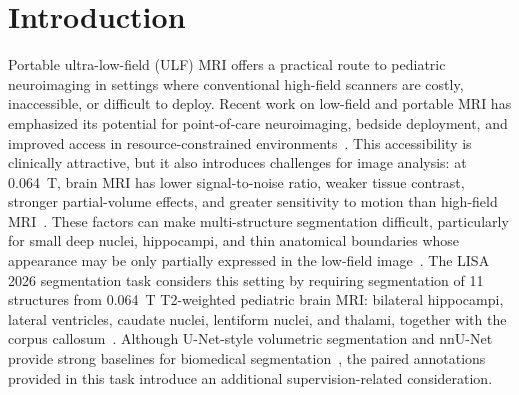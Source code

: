 \documentclass[runningheads]{llncs}
\begin{document}

\section{Introduction}

Portable ultra-low-field (ULF) MRI offers a practical route to pediatric neuroimaging in settings where conventional high-field scanners are costly, inaccessible, or difficult to deploy. Recent work on low-field and portable MRI has emphasized its potential for point-of-care neuroimaging, bedside deployment, and improved access in resource-constrained environments~\cite{arnold2023lowfield,kimberly2023brain,mazurek2021portable,sien2023feasibility}. This accessibility is clinically attractive, but it also introduces challenges for image analysis: at 0.064~T, brain MRI has lower signal-to-noise ratio, weaker tissue contrast, stronger partial-volume effects, and greater sensitivity to motion than high-field MRI~\cite{arnold2023lowfield,kimberly2023brain,billot2023synthseg}. These factors can make multi-structure segmentation difficult, particularly for small deep nuclei, hippocampi, and thin anatomical boundaries whose appearance may be only partially expressed in the low-field image~\cite{lepore2025lisa}. The LISA 2026 segmentation task considers this setting by requiring segmentation of 11 structures from 0.064~T T2-weighted pediatric brain MRI: bilateral hippocampi, lateral ventricles, caudate nuclei, lentiform nuclei, and thalami, together with the corpus callosum~\cite{lisa2026challenge}. Although U-Net-style volumetric segmentation and nnU-Net provide strong baselines for biomedical segmentation~\cite{ronneberger2015unet,cicek20163dunet,isensee2021nnunet}, the paired annotations provided in this task introduce an additional supervision-related consideration.
\end{document}
